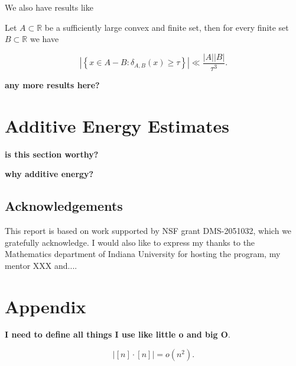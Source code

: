 \documentclass[12pt]{amsart}
\begin{document}
We also have results like

\begin{theorem}

    Let \(A \subset \mathbb{R} \) be a sufficiently large convex and finite set, then for every 
    finite set \(B \subset \mathbb{R} \) we have

    \[
        \left\lvert \left\{ x \in A-B : \delta_{A,B} (x) \geq \tau \right\}  \right\rvert \ll \frac{\left\lvert A \right\rvert \left\lvert B \right\rvert }{\tau^{3} }
    .\]
\end{theorem}

\textbf{any more results here?}

\section{Additive Energy Estimates}

\textbf{is this section worthy?}

\textbf{why additive energy?}



\subsection*{Acknowledgements} %
This report is based on work supported by NSF grant DMS-2051032, which we gratefully acknowledge. I would also like to express my thanks to the Mathematics department of Indiana University for hosting the program, my mentor XXX and....




\section*{Appendix}

\textbf{I need to define all things I use like little o and big O}.

\begin{theorem*}
\[
    \left\lvert [n] \cdot [n] \right\rvert = o(n^{2})
.\]
\end{theorem*}
\end{document}
